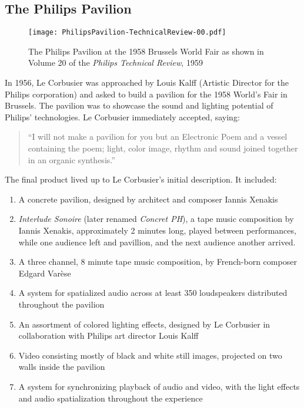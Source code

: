 \subsection{The Philips Pavilion}
\label{sec:philips-pavilion-1}
\begin{figure}[h]
  \texttt{[image: PhilipsPavilion-TechnicalReview-00.pdf]}
  \caption{The Philips Pavilion at the 1958 Brussels World Fair as
    shown in Volume 20 of the \textit{Philips Technical Review}, 1959}
  \label{fig:philips-pavilion-photo}
\end{figure}
In 1956, Le Corbusier was approached by Louis Kalff (Artistic Director
for the Philips corporation) and asked to build a pavilion for the
1958 World's Fair in Brussels. The pavilion was to showcase the sound
and lighting potential of Philips' technologies. Le Corbusier
immediately accepted, saying:
\begin{quotation}
  ``I will not make a pavilion for you but an Electronic Poem and a
  vessel containing the poem; light, color image, rhythm and sound
  joined together in an organic synthesis.''\cite{Lopez2011} 
\end{quotation}
The final product lived up to Le Corbusier's initial description. It
included:\cite{Lombardo2009}
\begin{enumerate}
\item A concrete pavilion, designed by architect and composer Iannis
  Xenakis
\item \textit{Interlude Sonoire} (later renamed \textit{Concret PH}), a
  tape music composition by Iannis Xenakis, approximately 2 minutes
  long, played between performances, while one audience left and
  pavillion, and the next audience another arrived.
\item A three channel, 8 minute tape music composition, by French-born
  composer Edgard Var\`{e}se
\item A system for spatialized audio across at least 350 loudspeakers
  distributed throughout the pavilion
\item An assortment of colored lighting effects, designed by Le Corbusier in
  collaboration with Philips art director Louis Kalff
\item Video consisting mostly of black and white still images,
  projected on two walls inside the pavilion
\item A system for synchronizing playback of audio and video,
  with the light effects and audio spatialization throughout the
  experience
\end{enumerate} 

